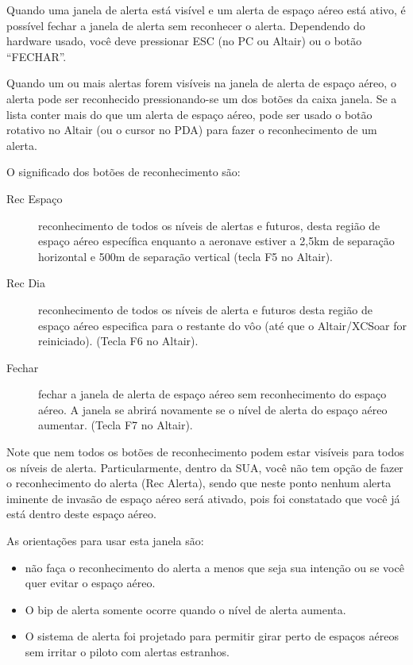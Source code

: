 Quando uma janela de alerta está visível e um alerta de espaço aéreo está ativo, é possível fechar a janela de alerta sem reconhecer o alerta.  Dependendo do hardware usado, você deve pressionar ESC (no PC ou Altair) ou o botão “FECHAR”.

Quando um ou mais alertas forem visíveis na janela de alerta de espaço aéreo, o alerta pode ser reconhecido pressionando-se um dos botões da caixa janela.  Se a lista conter mais do que um alerta de espaço aéreo, pode ser usado o botão rotativo no Altair (ou o cursor no PDA) para fazer o reconhecimento de um alerta.

O significado dos botões de reconhecimento são:

\begin{description}
\item[Rec Espaço]  reconhecimento de todos os níveis de alertas e futuros, desta região de espaço aéreo específica enquanto a aeronave estiver a 2,5km de separação horizontal e 500m de separação vertical (tecla F5 no Altair).
\item[Rec Dia]  reconhecimento de todos os níveis de alerta e futuros desta região de espaço aéreo especifica para o restante do vôo (até que o Altair/XCSoar for reiniciado).  (Tecla F6 no Altair). 
\item[Fechar]  fechar a janela de alerta de espaço aéreo sem reconhecimento do espaço aéreo.  A janela se abrirá novamente se o nível de alerta do espaço aéreo aumentar.  (Tecla F7 no Altair).

\end{description}

Note que nem todos os botões de reconhecimento podem estar visíveis para todos os níveis de alerta.  Particularmente, dentro da SUA, você não tem opção de fazer o reconhecimento do alerta (Rec Alerta), sendo que neste ponto nenhum alerta iminente de invasão de espaço aéreo será ativado, pois foi constatado que você já está dentro deste espaço aéreo.

As orientações para usar esta janela são:
\begin{itemize}
\item  não faça o reconhecimento do alerta a menos que seja sua intenção ou se você quer evitar o espaço aéreo.
\item O bip de alerta somente ocorre quando o nível de alerta aumenta.
\item O sistema de alerta foi projetado para permitir girar perto de espaços aéreos sem irritar o piloto com alertas estranhos.
\end{itemize}

